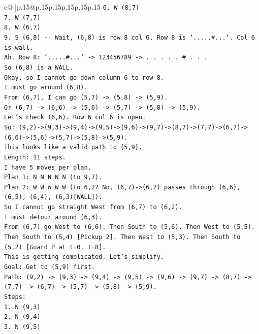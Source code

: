 \documentclass{article}
\begin{document}
{\begin{supertabular}{c@{$\;$}|p{.15\linewidth}@{}p{.15\linewidth}p{.15\linewidth}p{.15\linewidth}p{.15\linewidth}p{.15\linewidth}}
{{{\texttt{6. W (8,7)} \\
\texttt{7. W (7,7)} \\
\texttt{8. W (6,7)} \\
\texttt{9. S (6,8) {-}{-} Wait, (6,8) is row 8 col 6. Row 8 is `.....\#...`. Col 6 is wall.} \\
\texttt{Ah, Row 8: `.....\#...` {-}> 123456789 {-}> . . . . . \# . . .} \\
\texttt{So (6,8) is a WALL.} \\
\texttt{Okay, so I cannot go down column 6 to row 8.} \\
\texttt{I must go around (6,8).} \\
\texttt{From (6,7), I can go (5,7) {-}> (5,8) {-}> (5,9).} \\
\texttt{Or (6,7) {-}> (6,6) {-}> (5,6) {-}> (5,7) {-}> (5,8) {-}> (5,9).} \\
\texttt{Let's check (6,6). Row 6 col 6 is open.} \\
\texttt{So: (9,2){-}>(9,3){-}>(9,4){-}>(9,5){-}>(9,6){-}>(9,7){-}>(8,7){-}>(7,7){-}>(6,7){-}>(6,6){-}>(5,6){-}>(5,7){-}>(5,8){-}>(5,9).} \\
\texttt{This looks like a valid path to (5,9).} \\
\texttt{Length: 11 steps.} \\
\texttt{I have 5 moves per plan.} \\
\texttt{Plan 1: N N N N N (to 9,7).} \\
\texttt{Plan 2: W W W W W (to 6,2? No, (6,7){-}>(6,2) passes through (6,6), (6,5), (6,4), (6,3){[}WALL{]}).} \\
\texttt{So I cannot go straight West from (6,7) to (6,2).} \\
\texttt{I must detour around (6,3).} \\
\texttt{From (6,7) go West to (6,6). Then South to (5,6). Then West to (5,5). Then South to (5,4) {[}Pickup 2{]}. Then West to (5,3). Then South to (5,2) {[}Guard P at t=0, t=8{]}.} \\
\texttt{This is getting complicated. Let's simplify.} \\
\texttt{Goal: Get to (5,9) first.} \\
\texttt{Path: (9,2) {-}> (9,3) {-}> (9,4) {-}> (9,5) {-}> (9,6) {-}> (9,7) {-}> (8,7) {-}> (7,7) {-}> (6,7) {-}> (5,7) {-}> (5,8) {-}> (5,9).} \\
\texttt{Steps:} \\
\texttt{1. N (9,3)} \\
\texttt{2. N (9,4)} \\
\texttt{3. N (9,5)} \\
}}}
\end{supertabular}}
\end{document}
